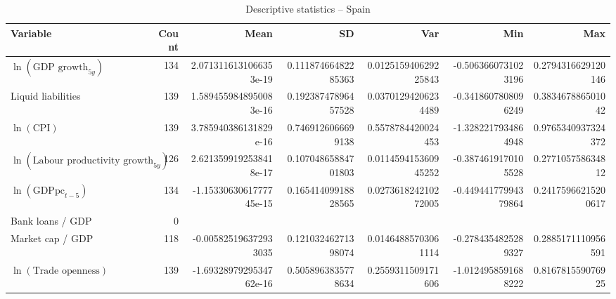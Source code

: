 \begin{table}[!htbp]
\centering
\caption{Descriptive statistics -- Spain}
\footnotesize
\begin{tabular}{lrrrrrr}
\toprule
Variable & Count & Mean & SD & Var & Min & Max \\
\midrule
$\ln(\text{GDP growth}_{5y})$ & 134 & 2.0713116131066353e-19 & 0.11187466482285363 & 0.012515940629225843 & -0.5063660731023196 & 0.2794316629120146 \\
Liquid liabilities & 139 & 1.5894559848950083e-16 & 0.19238747896457528 & 0.03701294206234489 & -0.3418607808096249 & 0.383467886501042 \\
$\ln(\text{CPI})$ & 139 & 3.785940386131829e-16 & 0.7469126066699138 & 0.5578784420024453 & -1.3282217934864948 & 0.9765340937324372 \\
$\ln(\text{Labour productivity growth}_{5y})$ & 126 & 2.6213599192538418e-17 & 0.10704865884701803 & 0.011459415360945252 & -0.3874619170105528 & 0.277105758634812 \\
$\ln(\text{GDPpc}_{t-5})$ & 134 & -1.1533063061777745e-15 & 0.16541409918828565 & 0.027361824210272005 & -0.44944177994379864 & 0.24175966215200617 \\
Bank loans / GDP & 0 &  &  &  &  &  \\
Market cap / GDP & 118 & -0.005825196372933035 & 0.12103246271398074 & 0.01464885703061114 & -0.2784354825289327 & 0.2885171110956591 \\
$\ln(\text{Trade openness})$ & 139 & -1.6932897929534762e-16 & 0.5058963835778634 & 0.2559311509171606 & -1.0124958591688222 & 0.816781559076925 \\
\bottomrule
\end{tabular}
\end{table}


